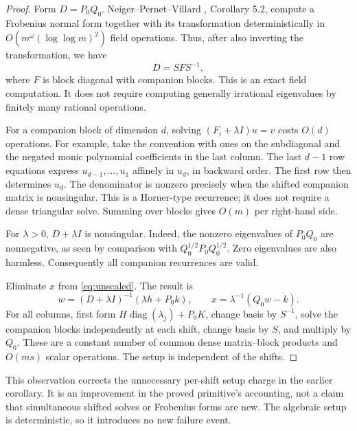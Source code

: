 \documentclass[11pt]{article}
\newcommand{\diag}{\operatorname{diag}}
\begin{document}
\begin{proof}
Form \(D=P_0Q_0\). Neiger--Pernet--Villard \cite{npv}, Corollary 5.2,
compute a Frobenius normal form together with its transformation
deterministically in
\(O(m^\omega(\log\log m)^2)\) field operations. Thus, after also
inverting the transformation, we have
\[
 D=S F S^{-1},
\]
where \(F\) is block diagonal with companion blocks. This is an exact
field computation. It does not require computing generally irrational
eigenvalues by finitely many rational operations.

For a companion block of dimension \(d\), solving
\((F_i+\lambda I)u=v\) costs \(O(d)\) operations. For example,
take the convention with ones on the subdiagonal and the negated monic
polynomial coefficients in the last column. The last \(d-1\) row
equations express \(u_{d-1},\ldots,u_1\) affinely in \(u_d\),
in backward order. The first row then determines \(u_d\). The
denominator is nonzero precisely when the shifted companion matrix is
nonsingular. This is a Horner-type recurrence; it does not require a
dense triangular solve. Summing over blocks gives \(O(m)\) per
right-hand side.

For \(\lambda>0\), \(D+\lambda I\) is nonsingular. Indeed,
the nonzero eigenvalues of \(P_0Q_0\) are nonnegative, as seen by
comparison with \(Q_0^{1/2}P_0Q_0^{1/2}\). Zero eigenvalues are
also harmless. Consequently all companion recurrences are valid.

Eliminate \(x\) from \eqref{eq:unscaled}. The result is
\begin{equation}\label{eq:block-solution}
 w=(D+\lambda I)^{-1}(\lambda h+P_0k),\qquad
 x=\lambda^{-1}(Q_0w-k).
\end{equation}
For all columns, first form \(H\diag(\lambda_j)+P_0K\), change
basis by \(S^{-1}\), solve the companion blocks independently at each
shift, change basis by \(S\), and multiply by \(Q_0\). These are
a constant number of common dense matrix--block products and \(O(ms)\)
scalar operations. The setup is independent of the shifts.
\end{proof}

This observation corrects the unnecessary per-shift setup charge in the
earlier corollary. It is an improvement in the proved primitive's accounting,
not a claim that simultaneous shifted solves or Frobenius forms are new.
The algebraic setup is deterministic, so it introduces no new failure event.
\end{document}
